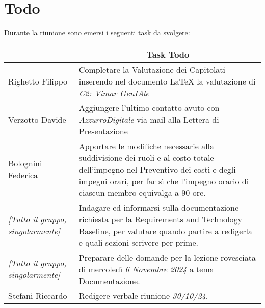 \section{Todo}

Durante la riunione sono emersi i seguenti task da svolgere:

\vspace{0.5cm}

\begin{table}[htbp]
\begin{tabular}{|p{}|p{}|}
    \hline
    \rowcolor[gray]{0.9}
    \multicolumn{1}{|c|}{\textbf{Assegnatario}} & \multicolumn{1}{|c|}{\textbf{Task Todo}} \\
    \hline
    Righetto Filippo & Completare la Valutazione dei Capitolati inserendo nel documento LaTeX la valutazione di \emph{C2: Vimar GenIAle} \\
    \hline
    Verzotto Davide & Aggiungere l'ultimo contatto avuto con \emph{AzzurroDigitale} via mail alla Lettera di Presentazione \\
    \hline
    Bolognini Federica & Apportare le modifiche necessarie alla suddivisione dei ruoli e al costo totale dell'impegno nel Preventivo 
    dei costi e degli impegni orari, per far sì che l'impegno orario di ciascun membro equivalga a 90 ore. \\
    \hline
    \emph{[Tutto il gruppo, singolarmente]} & Indagare ed informarsi sulla documentazione richiesta per la Requirements and Technology Baseline, per 
    valutare quando partire a redigerla e quali sezioni scrivere per prime. \\
    \hline
    \emph{[Tutto il gruppo, singolarmente]} & Preparare delle domande per la lezione rovesciata di mercoledì \emph{6 Novembre 2024} a tema Documentazione. \\
    \hline
    Stefani Riccardo & Redigere verbale riunione \emph{30/10/24}. \\
    \hline
\end{tabular}
\end{table}
